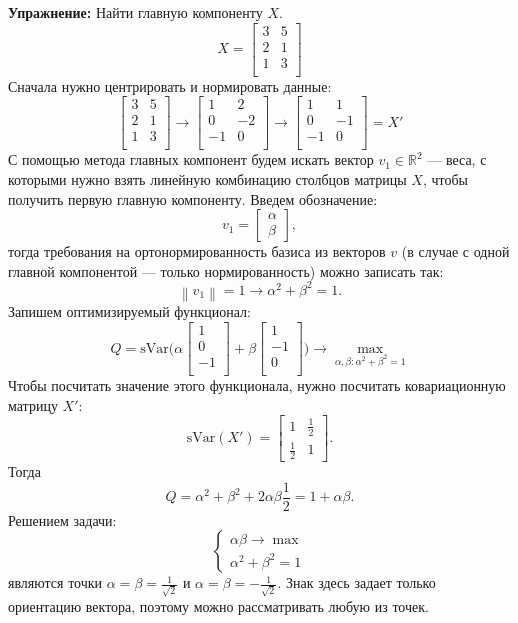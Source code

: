 \documentclass[12pt]{article} %
\theoremstyle{definition} %
\begin{document}
\textbf{Упражнение:} Найти главную компоненту $X$.
$$
X =
\begin{bmatrix}
3 & 5\\
2 & 1\\
1 & 3\\
\end{bmatrix}
$$
Сначала нужно центрировать и нормировать данные:
$$
\begin{bmatrix}
3 & 5\\
2 & 1\\
1 & 3\\
\end{bmatrix}
\to
\begin{bmatrix}
1 & 2\\
0 & -2\\
-1 & 0\\
\end{bmatrix}
\to
\begin{bmatrix}
1 & 1\\
0 & -1\\
-1 & 0\\
\end{bmatrix}
=X'
$$
С помощью метода главных компонент будем искать вектор $v_1 \in \mathbb{R}^2$  —  веса, с которыми нужно взять линейную комбинацию столбцов матрицы $X$, чтобы получить первую главную компоненту. Введем обозначение:
$$v_1
= \begin{bmatrix}
\alpha\\
\beta
\end{bmatrix},
$$
тогда требования на ортонормированность базиса из векторов $v$ (в случае с одной главной компонентой  — только нормированность) можно записать так:
$$\left\| v_1 \right\| = 1 \to \alpha^2 + \beta^2 = 1.$$
Запишем оптимизируемый функционал:
$$
Q = \text{sVar} \bigg(
\alpha \begin{bmatrix}
1\\
0\\
-1\\
\end{bmatrix}
+
\beta \begin{bmatrix}
1\\
-1\\
0\\
\end{bmatrix}
\bigg)
\to \max_{\alpha, \beta : \alpha^2+\beta^2=1}
$$
Чтобы посчитать значение этого функционала, нужно посчитать ковариационную матрицу $X'$:
$$
\text{sVar}(X')=
\begin{bmatrix}
1&\frac{1}{2}\\
\frac{1}{2}&1
\end{bmatrix}.
$$
Тогда
$$Q = \alpha^2 + \beta^2 + 2\alpha \beta \frac{1}{2} = 1+\alpha \beta.$$
Решением задачи:
$$
\begin{cases}
\alpha \beta \to \max \\
\alpha^2 + \beta^2 = 1
\end{cases}
$$
являются точки $\alpha=\beta=\frac{1}{\sqrt{2}}$ и $\alpha=\beta=-\frac{1}{\sqrt{2}}$. Знак здесь задает только ориентацию вектора, поэтому можно рассматривать любую из точек.
\end{document}

